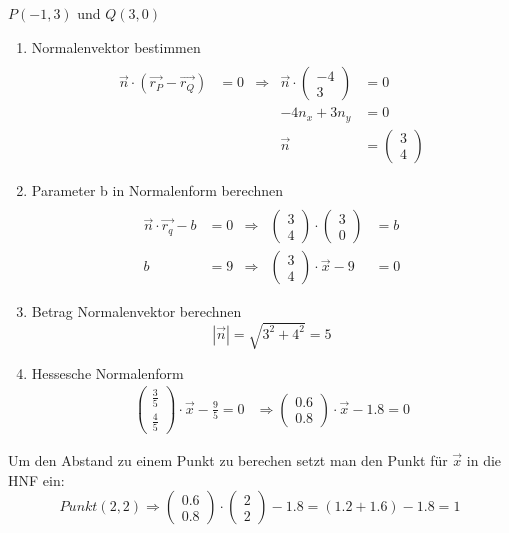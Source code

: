 $P(-1, 3)$ und $Q(3,0)$
\begin{enumerate}
  \item Normalenvektor bestimmen
  \[
    \begin{array}{llclc}
      \\ \vec{n} \cdot (\vec{r_P} - \vec{r_Q}) & = 0 & \Rightarrow & \vec{n} \cdot \begin{pmatrix} -4 \\ 3 \end{pmatrix} & = 0 
      \\ 
      & & & -4n_x + 3n_y & = 0
      \\ 
      & & & \vec{n} & = \begin{pmatrix} 3 \\ 4 \end{pmatrix}
    \end{array}
  \]
  \item Parameter b in Normalenform berechnen
  \[
    \begin{array}{llclc}
      \\ \vec{n} \cdot \vec{r_q} - b & = 0 & \Rightarrow & \begin{pmatrix} 3 \\ 4 \end{pmatrix} \cdot \begin{pmatrix} 3 \\ 0 \end{pmatrix} & = b 
      \\ 
      b & = 9 & \Rightarrow & \begin{pmatrix} 3 \\ 4 \end{pmatrix} \cdot \vec{x} - 9 & = 0
    \end{array}
  \] 
  \item Betrag Normalenvektor berechnen
  \[
    |\vec{n}| = \sqrt{3^2 + 4^2} = 5
  \]
  \item Hessesche Normalenform
  \[
    \begin{array}{lr}
        \begin{pmatrix}
          \frac{3}{5} \\
          \frac{4}{5}
        \end{pmatrix} \cdot \vec{x} - \frac{9}{5} = 0
      & \Rightarrow       
        \begin{pmatrix}
          0.6 \\
          0.8
        \end{pmatrix} \cdot \vec{x} - 1.8 = 0
    \end{array}
  \]
\end{enumerate}
Um den Abstand zu einem Punkt zu berechen setzt man den Punkt für $\vec{x}$ in die HNF ein:
\[
Punkt(2, 2) \Rightarrow         
\begin{pmatrix}
  0.6 \\
  0.8
\end{pmatrix} \cdot 
\begin{pmatrix}
  2 \\
  2
\end{pmatrix}
 - 1.8 = (1.2 + 1.6) - 1.8 = 1
\]

